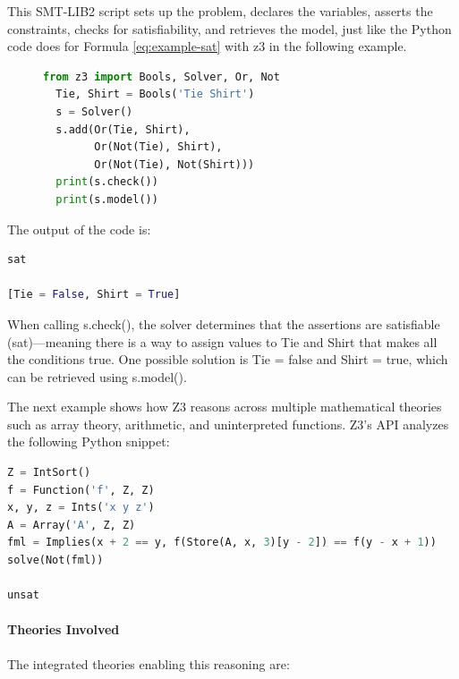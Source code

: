 \documentclass[]{rptuseminar}
\begin{document}
  This SMT-LIB2 script sets up the problem, declares the variables, asserts the constraints, checks for satisfiability, and retrieves the model, just like the Python code does for Formula \ref{eq:example-sat}  with z3 in the following example.

\begin{figure}[ht]
\begin{lstlisting}[language=Python]
  from z3 import Bools, Solver, Or, Not
  Tie, Shirt = Bools('Tie Shirt')
  s = Solver()
  s.add(Or(Tie, Shirt),
        Or(Not(Tie), Shirt),
        Or(Not(Tie), Not(Shirt)))
  print(s.check())
  print(s.model())
\end{lstlisting}
\end{figure}

\vspace{1em}
The output of the code is:
\begin{lstlisting}[language=Python]
sat

[Tie = False, Shirt = True]
\end{lstlisting}
\vspace{1em}


When calling s.check(), the solver determines that the assertions are satisfiable (sat)—meaning there is a way to assign values to Tie and Shirt that makes all the conditions true. One possible solution is Tie = false and Shirt = true, which can be retrieved using s.model().
\vspace{1em}



The next example shows how Z3 reasons across multiple mathematical theories such as array theory, arithmetic, and uninterpreted functions. Z3's API analyzes the following Python snippet:


\begin{lstlisting}[language=Python]
Z = IntSort()
f = Function('f', Z, Z)
x, y, z = Ints('x y z')
A = Array('A', Z, Z)
fml = Implies(x + 2 == y, f(Store(A, x, 3)[y - 2]) == f(y - x + 1))
solve(Not(fml))

unsat
\end{lstlisting}



\paragraph{Theories Involved}
The integrated theories enabling this reasoning are:
\end{document}
